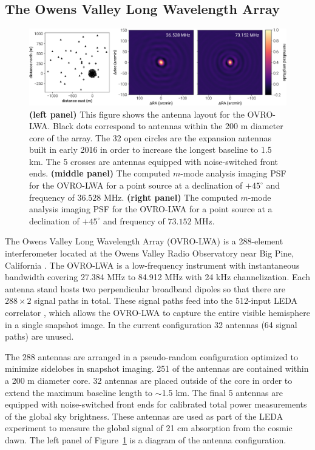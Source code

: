 \documentclass[twocolumn]{aastex61}
\begin{document}
\subsection{The Owens Valley Long Wavelength Array}

\begin{figure}[t]
    \includegraphics[width=\textwidth]{figures/psf/psf}
    \caption{
        \textbf{(left panel)}
        This figure shows the antenna layout for the OVRO-LWA. Black dots correspond to antennas
        within the 200 m diameter core of the array. The 32 open circles are the expansion antennas
        built in early 2016 in order to increase the longest baseline to 1.5 km. The 5 crosses are
        antennas equipped with noise-switched front ends.
        \textbf{(middle panel)}
        The computed $m$-mode analysis imaging PSF for the OVRO-LWA for a point source at a
        declination of $+45^\circ$ and frequency of $36.528$ MHz.
        \textbf{(right panel)}
        The computed $m$-mode analysis imaging PSF for the OVRO-LWA for a point source at a
        declination of $+45^\circ$ and frequency of $73.152$ MHz.
    }
    \label{fig:psf}
\end{figure}

The Owens Valley Long Wavelength Array (OVRO-LWA) is a 288-element interferometer located at the
Owens Valley Radio Observatory near Big Pine, California \citep{todo_hallinan_2017}.  The OVRO-LWA
is a low-frequency instrument with instantaneous bandwidth covering 27.384 MHz to 84.912 MHz with 24
kHz channelization.  Each antenna stand hosts two perpendicular broadband dipoles so that there are
$288\times2$ signal paths in total. These signal paths feed into the 512-input LEDA correlator
\citep{2015JAI.....450003K}, which allows the OVRO-LWA to capture the entire visible hemisphere in a
single snapshot image.  In the current configuration 32 antennas (64 signal paths) are unused.

The 288 antennas are arranged in a pseudo-random configuration optimized to minimize sidelobes in
snapshot imaging.  251 of the antennas are contained within a 200 m diameter core. 32 antennas are
placed outside of the core in order to extend the maximum baseline length to $\sim$1.5 km. The final
5 antennas are equipped with noise-switched front ends for calibrated total power measurements of
the global sky brightness.  These antennas are used as part of the LEDA experiment
\citep{todo_price_2017} to measure the global signal of 21 cm absorption from the cosmic dawn.  The
left panel of Figure~\ref{fig:psf} is a diagram of the antenna configuration.
\end{document}
